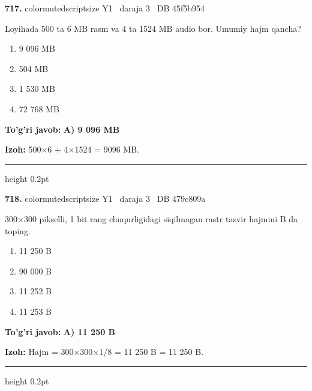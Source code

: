 \documentclass[10pt,a4paper,oneside]{article}
\begin{document}
\noindent\textbf{\color{ink}717.}  {color{muted}scriptsize Y1 \textbullet\ daraja 3 \textbullet\ DB 45f5b954}
\par
Loyihada 500 ta 6 MB rasm va 4 ta 1524 MB audio bor. Umumiy hajm qancha?
\begin{enumerate}[label=\Alph*),leftmargin=9mm]
\item 9 096 MB
\item 504 MB
\item 1 530 MB
\item 72 768 MB
\end{enumerate}
\begin{tcolorbox}[enhanced,breakable,colback=teal!4,colframe=teal!50!black,boxrule=0.5pt,arc=1.1mm,left=3mm,right=3mm,top=1.7mm,bottom=1.7mm,before skip=2mm,after skip=2mm]
\textbf{\color{teal}To'g'ri javob:} \textbf{A) 9 096 MB}
\par\smallskip
\textbf{Izoh:} 500\ensuremath{\times}6 + 4\ensuremath{\times}1524 = 9096 MB.
\end{tcolorbox}
\vspace{2mm}\hrule height 0.2pt \vspace{3mm}

\noindent\textbf{\color{ink}718.}  {color{muted}scriptsize Y1 \textbullet\ daraja 3 \textbullet\ DB 479c809a}
\par
300\ensuremath{\times}300 pikselli, 1 bit rang chuqurligidagi siqilmagan rastr tasvir hajmini B da toping.
\begin{enumerate}[label=\Alph*),leftmargin=9mm]
\item 11 250 B
\item 90 000 B
\item 11 252 B
\item 11 253 B
\end{enumerate}
\begin{tcolorbox}[enhanced,breakable,colback=teal!4,colframe=teal!50!black,boxrule=0.5pt,arc=1.1mm,left=3mm,right=3mm,top=1.7mm,bottom=1.7mm,before skip=2mm,after skip=2mm]
\textbf{\color{teal}To'g'ri javob:} \textbf{A) 11 250 B}
\par\smallskip
\textbf{Izoh:} Hajm = 300\ensuremath{\times}300\ensuremath{\times}1/8 = 11 250 B = 11 250 B.
\end{tcolorbox}
\vspace{2mm}\hrule height 0.2pt \vspace{3mm}
\end{document}
